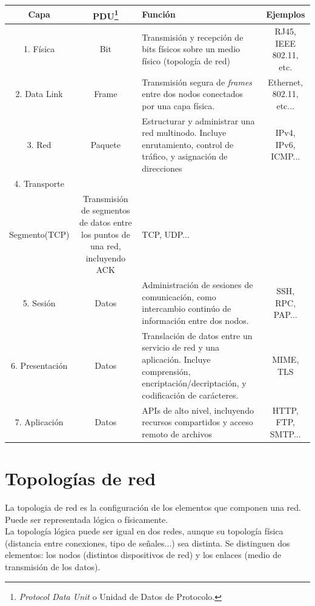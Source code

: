 \documentclass[a4paper, 11pt]{report} %
\begin{document}
\renewcommand{\arraystretch}{1} %
\noindent\linespread{1}
\begin{tabularx}{\linewidth}{ | c >{\small}c >{\small}X >{\small}c | }
	\rowcolor{header} \hline
	\textbf{Capa} & \textbf{PDU\footnote{\textit{Protocol Data Unit} o Unidad de Datos de Protocolo.}} & \textbf{Función} & \textbf{Ejemplos} \\ \hline
	1. Física & Bit & Transmisión y recepción de bits físicos sobre un medio físico (topología de red) & 	 RJ45, IEEE 802.11, etc. \\
	\label{osi}
	2. Data Link & Frame & Transmisión segura de \textit{frames} entre dos nodos conectados por una capa física. & Ethernet, 802.11, etc...\\
	3. Red & Paquete & Estructurar y administrar una red multinodo. Incluye enrutamiento, control de tráfico, y asignación de direcciones & IPv4, IPv6, ICMP... \\
	4. Transporte & \begin{tabular}[t]{@{}c@{}}Datagrama(UDP)\\Segmento(TCP)  \end{tabular} &
	Transmisión de segmentos de datos entre los puntos de una red, incluyendo ACK & TCP, UDP...\\
	5. Sesión & Datos & Administración de sesiones de comunicación, como intercambio continúo de información entre dos nodos. & SSH, RPC, PAP...\\ 
	6. Presentación & Datos & Translación de datos entre un servicio de red y una aplicación. Incluye comprensión, encriptación/decriptación, y codificación de carácteres. & MIME, TLS \\
	7. Aplicación & Datos & APIs de alto nivel, incluyendo recursos compartidos y acceso remoto de archivos & HTTP, FTP, SMTP... \\ \hline
\end{tabularx}

\newpage
\section{Topologías de red}
\label{topdred}
La \gls{topologia} de red es la configuración de los elementos que componen una red. Puede ser representada lógica o físicamente. \\
La topología lógica puede ser igual en dos redes, aunque su topología física (distancia entre conexiones, tipo de señales...) sea distinta. 
Se distinguen dos elementos: los nodos (distintos dispositivos de red) y los enlaces (medio de transmisión de los datos).
\end{document}
